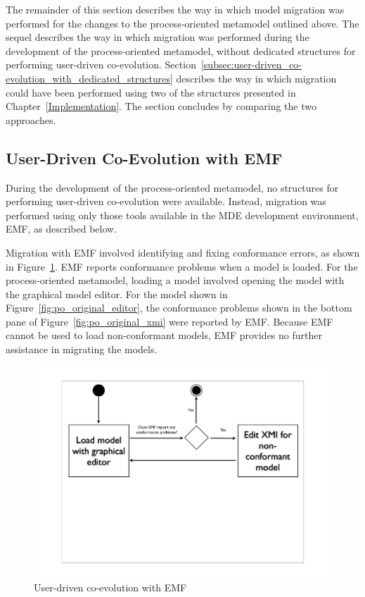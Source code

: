 The remainder of this section describes the way in which model migration was performed for the changes to the process-oriented metamodel outlined above.
The sequel describes the way in which migration was performed during the development of the process-oriented metamodel, without dedicated structures for performing user-driven co-evolution. Section~\ref{subsec:user-driven_co-evolution_with_dedicated_structures} describes the way in which migration could have been performed using two of the structures presented in Chapter~\ref{Implementation}. The section concludes by comparing the two approaches.

\subsection{User-Driven Co-Evolution with EMF}
During the development of the process-oriented metamodel, no structures for performing user-driven co-evolution were available. Instead, migration was performed using only those tools available in the MDE development environment, EMF, as described below.

Migration with EMF involved identifying and fixing conformance errors, as shown in Figure~\ref{fig:emf_process}. EMF reports conformance problems when a model is loaded. For the process-oriented metamodel, loading a model involved opening the model with the graphical model editor. For the model shown in Figure~\ref{fig:po_original_editor}, the conformance problems shown in the bottom pane of Figure~\ref{fig:po_original_xmi} were reported by EMF. Because EMF cannot be used to load non-conformant models, EMF provides no further assistance in migrating the models. 

\begin{figure}[htbp]
	\centering
		\includegraphics[width=13.5cm]{6.Evaluation/images/user_driven/emf_process.pdf}
	\caption{User-driven co-evolution with EMF}
	\label{fig:emf_process}
\end{figure}

